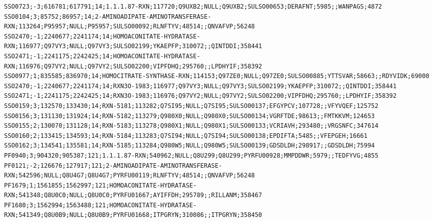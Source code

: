 \begin{adjustbox}{width=\textwidth}
\begin{lstlisting}[basicstyle=\tiny\normalfont\ttfamily,caption=LysineAAA.csv]
SSO0723;-3;616781;617791;14;1.1.1.87-RXN;117720;Q9UXB2;NULL;Q9UXB2;SULSO00653;DERAFNT;5985;;WANPAGS;4872
SSO0104;3;85752;86957;14;2-AMINOADIPATE-AMINOTRANSFERASE-RXN;113264;P95957;NULL;P95957;SULSO00092;RLNFTYV;48514;;QNVAFVP;56248
SSO2470;-1;2240677;2241174;14;HOMOACONITATE-HYDRATASE-RXN;116977;Q97VY3;NULL;Q97VY3;SULSO02199;YKAEPFP;310072;;QINTDDI;358441
SSO2471;-1;2241175;2242425;14;HOMOACONITATE-HYDRATASE-RXN;116976;Q97VY2;NULL;Q97VY2;SULSO02200;VIPFDHQ;295760;;LPDHYIF;358392
SSO0977;1;835585;836970;14;HOMOCITRATE-SYNTHASE-RXN;114153;Q97ZE0;NULL;Q97ZE0;SULSO00885;YTTSVAR;58663;;RDYVIDK;69000
SSO2470;-1;2240677;2241174;14;RXN3O-1983;116977;Q97VY3;NULL;Q97VY3;SULSO02199;YKAEPFP;310072;;QINTDDI;358441
SSO2471;-1;2241175;2242425;14;RXN3O-1983;116976;Q97VY2;NULL;Q97VY2;SULSO02200;VIPFDHQ;295760;;LPDHYIF;358392
SSO0159;3;132570;133430;14;RXN-5181;113282;Q7SI95;NULL;Q7SI95;SULSO00137;EFGYPCV;107728;;VFYVQEF;125752
SSO0156;3;131130;131924;14;RXN-5182;113279;Q980X0;NULL;Q980X0;SULSO00134;VGRFTDE;98613;;FMTKKVM;124653
SSO0155;2;130070;131128;14;RXN-5183;113278;Q980X1;NULL;Q980X1;SULSO00133;VCRIAVH;293480;;VRGSNFC;347614
SSO0160;2;133415;134593;14;RXN-5184;113283;Q7SI94;NULL;Q7SI94;SULSO00138;EPDIFTA;5485;;VFEPGEH;16661
SSO0162;3;134541;135581;14;RXN-5185;113284;Q980W5;NULL;Q980W5;SULSO00139;GDSDLDH;298917;;GDSDLDH;75994
PF0940;3;904320;905387;121;1.1.1.87-RXN;540962;NULL;Q8U299;Q8U299;PYRFU00928;MMPDDWR;5979;;TEDFYVG;4855
PF0121;-2;126676;127917;121;2-AMINOADIPATE-AMINOTRANSFERASE-RXN;542596;NULL;Q8U4G7;Q8U4G7;PYRFU00119;RLNFTYV;48514;;QNVAFVP;56248
PF1679;1;1561855;1562997;121;HOMOACONITATE-HYDRATASE-RXN;541348;Q8U0C0;NULL;Q8U0C0;PYRFU01667;AYIFFDH;295789;;RILLANM;358467
PF1680;3;1562994;1563488;121;HOMOACONITATE-HYDRATASE-RXN;541349;Q8U0B9;NULL;Q8U0B9;PYRFU01668;ITPGRYN;310086;;ITPGRYN;358450
\end{lstlisting}
\end{adjustbox}
	
